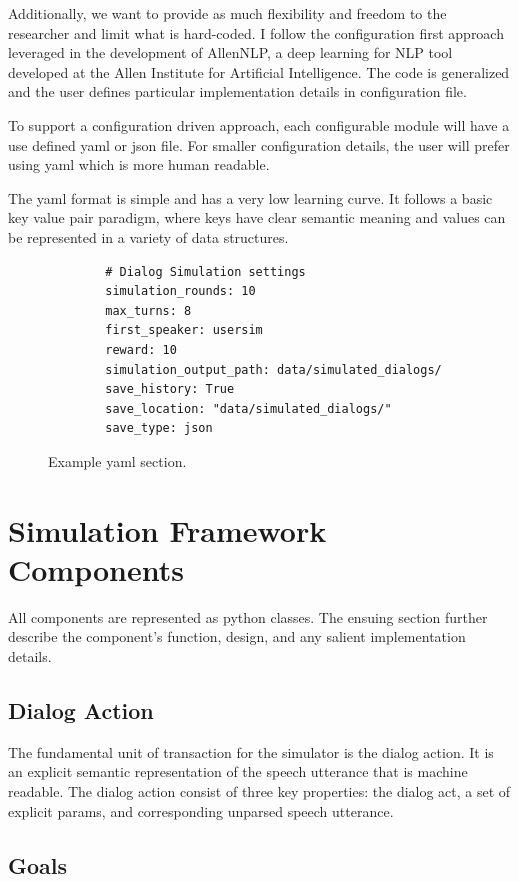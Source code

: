 Additionally, we want to provide as much flexibility and freedom to the researcher and limit what is hard-coded. I follow the configuration first approach leveraged in the development of AllenNLP, a deep learning for NLP tool developed at the Allen Institute for Artificial Intelligence. The code is generalized and the user defines particular implementation details in configuration file. 

To support a configuration driven approach, each configurable module will have a use defined yaml or json file. For smaller configuration details, the user will prefer using yaml which is more human readable. 

The yaml format is simple and has a very low learning curve. It follows a basic key value pair paradigm, where keys have clear semantic meaning and values can be represented in a variety of data structures. 
\begin{figure}[h!]
	\caption{Example yaml section. }
	\label{fig:ex_yaml}
	\begin{lstlisting}
		# Dialog Simulation settings
		simulation_rounds: 10
		max_turns: 8
		first_speaker: usersim
		reward: 10
		simulation_output_path: data/simulated_dialogs/
		save_history: True
		save_location: "data/simulated_dialogs/"
		save_type: json
	\end{lstlisting}
\end{figure}

\section{ Simulation Framework Components}

All components are represented as python classes. The ensuing section further describe the component's function, design, and any salient implementation details. 

\subsection{Dialog Action}
The fundamental unit of transaction for the simulator is the dialog action. It is an explicit semantic representation of the speech utterance that is machine readable. The dialog action consist of three key properties: the dialog act, a set of explicit params, and corresponding unparsed speech utterance. 


 

\subsection{Goals}

